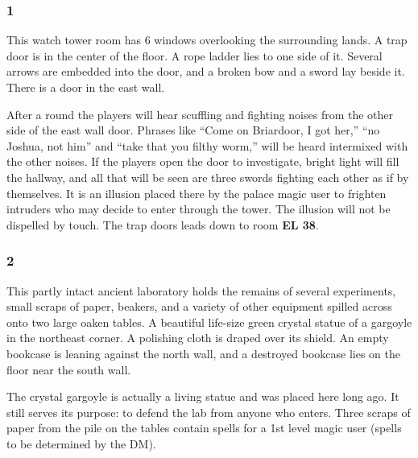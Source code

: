 \documentclass[palace_of_the_silver_princess]{subfiles}
\begin{document}
\selectfont
\clearpage


\subsubsection{1}
\begin{quotebox}
    This watch tower room has 6 windows overlooking the surrounding
    lands. A trap door is in the center of the floor. A rope ladder lies
    to one side of it. Several arrows are embedded into the door, and a
    broken bow and a sword lay beside it.  There is a door in the east
    wall.
\end{quotebox}

After a round the players will hear scuffling and fighting noises from
the other side of the east wall door. Phrases like “Come on Briardoor, I
got her,” “no Joshua, not him” and “take that you filthy worm,” will be
heard intermixed with the other noises. If the players open the door to
investigate, bright light will fill the hallway, and all that will be
seen are three swords fighting each other as if by themselves. It is an
illusion placed there by the palace magic user to frighten intruders who
may decide to enter through the tower. The illusion will not be
dispelled by touch. The trap doors leads down to room \textbf{EL 38}.

\subsubsection{2}
\begin{quotebox}
    This partly intact ancient laboratory holds the remains of several
    experiments, small scraps of paper, beakers, and a variety of other
    equipment spilled across onto two large oaken tables. A beautiful
    life-size green crystal statue of a gargoyle in the northeast
    corner. A polishing cloth is draped over its shield. An empty
    bookcase is leaning against the north wall, and a destroyed bookcase
    lies on the floor near the south wall.
\end{quotebox}

The crystal gargoyle is actually a living statue and was placed here long
ago. It still serves its purpose: to defend the lab from anyone who
enters. Three scraps of paper from the pile on the tables contain spells
for a 1st level magic user (spells to be determined by the DM).
\end{document}
